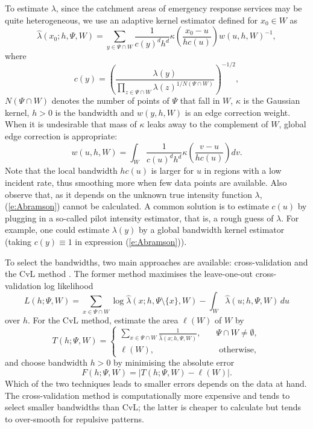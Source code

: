 \documentclass[twoside,11pt]{article}
\begin{document}
To estimate $\lambda$, since the catchment areas of emergency response 
services may be quite heterogeneous, we use an adaptive kernel estimator 
\citep{Abra82,Davietal18,Lies21} defined for $x_0 \in W$ as
\begin{equation}
\label{e:Abramson}
\widehat\lambda( x_0; h, \Psi, W )  =
  \sum_{y\in \Psi\cap W}  \frac{1}{c(y)^d h^d} \kappa\left(
    \frac{x_0-u}{h c(u) } \right) w(u, h, W)^{-1},
\end{equation}
where
\begin{equation}
\label{e:Abra-c}
c(y) = \left(
  \frac{\lambda(y)}{ \prod_{z\in\Psi\cap W} \lambda(z)^{1/N(\Psi\cap W)} }
\right)^{-1/2},
\end{equation}
$N(\Psi\cap W)$ denotes the number of points of $\Psi$ that fall in $W$,
$\kappa$ is the Gaussian kernel, $h>0$ is the bandwidth
and $w(y,h, W)$ is an edge correction weight. When it is undesirable
that mass of $\kappa$ leaks away to the complement of $W$, global
edge correction \citep{Lies12} is appropriate:
\[
w(u,h,W) =  \int_W \frac{1}{c(u)^d h^d} \kappa\left(
    \frac{v-u}{h c(u) } \right) dv.
\]
Note that the local bandwidth $h c(u)$ is larger for $u$ in 
regions with a low incident rate, thus smoothing more when few
data points are available. Also observe that, as it depends on 
the unknown true intensity function $\lambda$, (\ref{e:Abramson}) 
cannot be calculated. A common solution is to estimate $c(u)$ by 
plugging in a so-called pilot intensity estimator, that is, a 
rough guess of $\lambda$. For example, one could estimate
$\lambda(y)$ by a global bandwidth kernel estimator (taking
$c(y)\equiv 1$ in expression (\ref{e:Abramson})).

To select the bandwidths, two main approaches are available: 
cross-vali\-dation \citep{Load99} and the CvL method 
\citep{CronLies18,Lies24}. The former method maximises the 
leave-one-out cross-vali\-dation log likelihood
\begin{equation}
\label{e:bwPPL}
L(h;\Psi, W)=
\sum_{x\in\Psi\cap W} 
  \log \widehat \lambda(x; h, \Psi\setminus \{ x \}, W)
- \int_W \widehat \lambda( u; h, \Psi, W) \, du
\end{equation}
over $h$. For the CvL method, estimate the area $\ell(W)$
of $W$ by
\[
\label{e:HamFun}
T(h;\Psi, W) = \left\{ \begin{array}{ll}
  \displaystyle
  \sum_{x\in\Psi\cap W} \frac{1}{\widehat\lambda(x;h, \Psi, W)},
& \quad \Psi\cap W \neq \emptyset, \\
\ell(W), & \quad \mbox{ otherwise},
\end{array} \right.
\]
and choose bandwidth $h>0$ by minimising the absolute error
\begin{equation}
\label{e:DefHam}
F(h;\Psi, W) =
\left| T(h;\Psi, W) -\ell(W) \right|.
\end{equation}
Which of the two techniques leads to smaller errors depends
on the data at hand. The cross-validation method is 
computationally more expensive and tends to select
smaller bandwidths than CvL; the latter is cheaper to calculate but
tends to over-smooth for repulsive patterns. 
\end{document}
